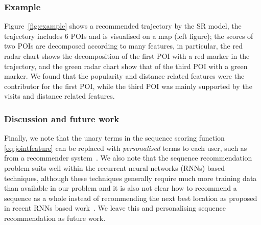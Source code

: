 \subsubsection{Example}
\label{sec:example}

Figure~\ref{fig:example} shows a recommended trajectory by the SR model, 
the trajectory includes 6 POIs and is visualised on a map (left figure);
the scores of two POIs are decomposed according to many features,
in particular, the red radar chart shows the decomposition of the first POI with a red marker in the trajectory,
and the green radar chart show that of the third POI with a green marker. 
We found that the popularity and distance related features were the contributor for the first POI, 
while the third POI was mainly supported by the visits and distance related features.





\subsubsection{Discussion and future work}
Finally, we note that the unary terms in the sequence scoring function \eqref{eq:jointfeature} can be replaced with {\em personalised} terms to each user, such as from a recommender system~\cite{Koren:2009,bpr09}. 
We also note that the sequence recommendation problem suits well within the recurrent neural networks (RNNs) based techniques, 
although these techniques generally require much more training data than available in our problem and 
it is also not clear how to recommend a sequence as a whole instead of recommending the next best location as proposed in recent RNNs based work~\cite{aaai16}.
We leave this and personalising sequence recommendation as future work.

